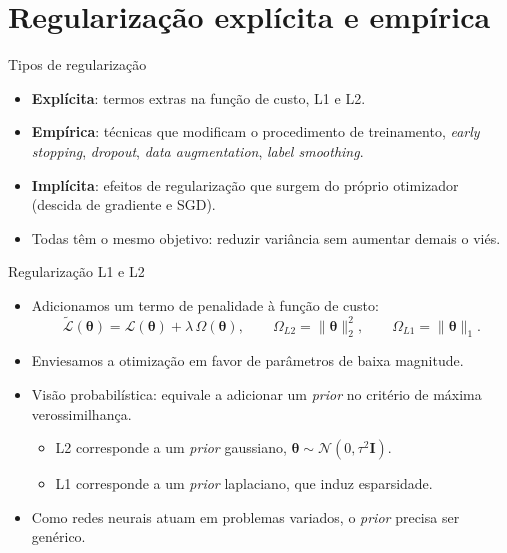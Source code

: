 \documentclass[aspectratio=169,xcolor=dvipsnames]{beamer}
\begin{document}
  \section{Regularização explícita e empírica}

  \begin{frame}{Tipos de regularização}
    \begin{itemize}
      \item \textbf{Explícita}: termos extras na função de custo,
        L1 e L2.
      \item \textbf{Empírica}: técnicas que modificam o procedimento de
        treinamento, \textit{early stopping}, \textit{dropout},
        \textit{data augmentation}, \textit{label smoothing}.
      \item \textbf{Implícita}: efeitos de regularização que surgem
        do próprio otimizador (descida de gradiente e SGD).
      \item Todas têm o mesmo objetivo: reduzir variância sem aumentar
        demais o viés.
    \end{itemize}
  \end{frame}

  \begin{frame}{Regularização L1 e L2}
    \begin{itemize}
      \item Adicionamos um termo de penalidade à função de custo:
        $$\tilde{\mathcal{L}}(\bm{\theta}) = \mathcal{L}(\bm{\theta}) + \lambda \, \Omega(\bm{\theta}),
          \qquad \Omega_{L2} = \|\bm{\theta}\|_2^2,
          \qquad \Omega_{L1} = \|\bm{\theta}\|_1.$$
      \item Enviesamos a otimização em favor de parâmetros de \alert{baixa magnitude}.
      \item Visão probabilística: equivale a adicionar um \textit{prior}
        no critério de máxima verossimilhança.
      \begin{itemize}
        \item L2 corresponde a um \textit{prior} gaussiano,
          $\bm{\theta} \sim \mathcal{N}(0, \tau^2 \mathbf{I})$.
        \item L1 corresponde a um \textit{prior} laplaciano,
          que induz \alert{esparsidade}.
      \end{itemize}
      \item Como redes neurais atuam em problemas variados, o \textit{prior}
        precisa ser genérico.
    \end{itemize}
  \end{frame}
\end{document}
